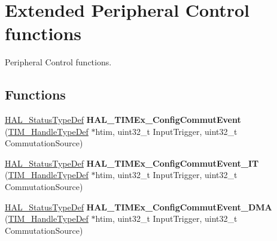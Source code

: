 \hypertarget{group___t_i_m_ex___exported___functions___group5}{}\section{Extended Peripheral Control functions}
\label{group___t_i_m_ex___exported___functions___group5}


Peripheral Control functions.  


\subsection*{Functions}
\begin{DoxyCompactItemize}
\item 
\mbox{\label{group___t_i_m_ex___exported___functions___group5_gab5802aa4b8b5a79b93b209b0277622ac}} 
\mbox{\hyperlink{stm32f7xx__hal__def_8h_a63c0679d1cb8b8c684fbb0632743478f}{H\+A\+L\+\_\+\+Status\+Type\+Def}} {\bfseries H\+A\+L\+\_\+\+T\+I\+M\+Ex\+\_\+\+Config\+Commut\+Event} (\mbox{\hyperlink{struct_t_i_m___handle_type_def}{T\+I\+M\+\_\+\+Handle\+Type\+Def}} $\ast$htim, uint32\+\_\+t Input\+Trigger, uint32\+\_\+t Commutation\+Source)
\item 
\mbox{\label{group___t_i_m_ex___exported___functions___group5_gad9f5f717a203adafb70e66451b4f0472}} 
\mbox{\hyperlink{stm32f7xx__hal__def_8h_a63c0679d1cb8b8c684fbb0632743478f}{H\+A\+L\+\_\+\+Status\+Type\+Def}} {\bfseries H\+A\+L\+\_\+\+T\+I\+M\+Ex\+\_\+\+Config\+Commut\+Event\+\_\+\+IT} (\mbox{\hyperlink{struct_t_i_m___handle_type_def}{T\+I\+M\+\_\+\+Handle\+Type\+Def}} $\ast$htim, uint32\+\_\+t Input\+Trigger, uint32\+\_\+t Commutation\+Source)
\item 
\mbox{\label{group___t_i_m_ex___exported___functions___group5_ga6ab2af489cfc5783e4ddd76a35edde31}} 
\mbox{\hyperlink{stm32f7xx__hal__def_8h_a63c0679d1cb8b8c684fbb0632743478f}{H\+A\+L\+\_\+\+Status\+Type\+Def}} {\bfseries H\+A\+L\+\_\+\+T\+I\+M\+Ex\+\_\+\+Config\+Commut\+Event\+\_\+\+D\+MA} (\mbox{\hyperlink{struct_t_i_m___handle_type_def}{T\+I\+M\+\_\+\+Handle\+Type\+Def}} $\ast$htim, uint32\+\_\+t Input\+Trigger, uint32\+\_\+t Commutation\+Source)
\item 

\end{DoxyCompactItemize}
